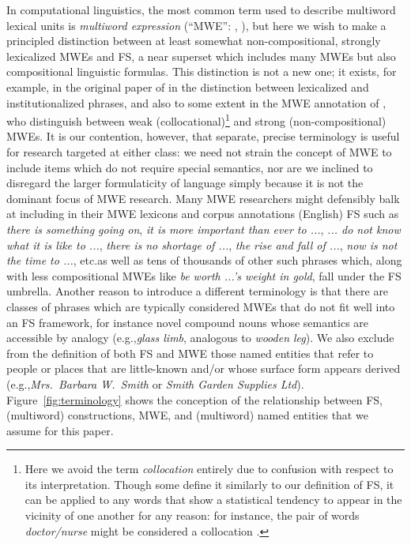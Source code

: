 \documentclass[11pt,letterpaper]{article}
\makeatletter
\def \eg {e.g.,\@ }
\def \etc {etc.\@ }
\newcommand{\dotts}{...\xspace}
\newcommand{\ex}[1]{\textit{#1}\xspace}
\newcommand{\figref}[2][]{Figure#1~\ref{#2}\xspace}
\makeatother
\begin{document}
In computational linguistics, the most common term used to describe multiword lexical units is \emph{multiword expression} (``MWE'': , ), but here we wish to make a principled distinction between at least somewhat non-compositional, strongly lexicalized MWEs and FS, a near superset which includes many MWEs but also compositional linguistic formulas. This distinction is not a new one; it exists, for example, in the original paper of  in the distinction between lexicalized and institutionalized phrases, and also to some extent in the MWE annotation of , who distinguish between weak (collocational)\footnote{Here we avoid the term \emph{collocation} entirely due to confusion with respect to its interpretation. Though some define it similarly to our definition of FS, it can be applied to any words that show a statistical tendency to appear in the vicinity of one another for any reason: for instance, the pair of words \ex{doctor/nurse} might be considered a collocation \cite{Ramisch14}.}  and strong (non-compositional) MWEs. It is our contention, however, that separate, precise terminology is useful for research targeted at either class: we need not strain the concept of MWE to include items which do not require special semantics, nor are we inclined to disregard the larger formulaticity of language simply because it is not the dominant focus of MWE research. Many MWE researchers might defensibly balk at including in their MWE lexicons and corpus annotations (English) FS such as \ex{there is something going on}, \ex{it is more important than ever to \dotts}, \ex{\dotts do not know what it is like to \dotts}, \ex{there is no shortage of \dotts}, \ex{the rise and fall of \dotts}, \ex{now is not the time to \dotts}, \etc as well as tens of thousands of other such phrases which, along with less compositional MWEs like \ex{be worth \dotts's weight in gold}, fall under the FS umbrella. Another reason to introduce a different terminology is that there are classes of phrases which are typically considered MWEs that do not fit well into an FS framework, for instance novel compound nouns whose semantics are accessible by analogy (\eg \ex{glass limb}, analogous to \ex{wooden leg}). We also exclude from the definition of both FS and MWE those named entities that refer to people or places that are little-known and/or whose surface form appears derived (\eg \ex{Mrs.\ Barbara W.\ Smith} or \ex{Smith Garden Supplies Ltd}). \figref{fig:terminology} shows the conception of the relationship between FS, (multiword) constructions, MWE, and (multiword) named entities that we assume for this paper.
\end{document}
